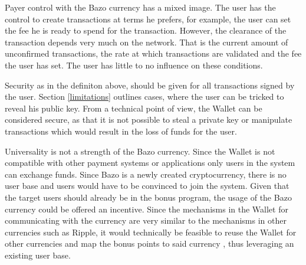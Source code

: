Payer control with the Bazo currency has a mixed image.
The user has the control to create transactions at terms he prefers, for example, the user can set the fee he is ready to spend for the transaction. However, the clearance of the transaction depends very much on the network. That is the current amount of unconfirmed transactions, the rate at which transactions are validated and the fee the user has set. The user has little to no influence on these conditions.

Security as in the definiton above, should be given for all transactions signed by the user. Section \ref{limitations} outlines cases, where the user can be tricked to reveal his public key. From a technical point of view, the Wallet can be considered secure, as that it is not possible to steal a private key or manipulate transactions which would result in the loss of funds for the user.

Universality is not a strength of the Bazo currency. Since the Wallet is not compatible with other payment systems or applications only users in the system can exchange funds. Since Bazo is a newly created cryptocurrency, there is no user base and users would have to be convinced to join the system. Given that the target users should already be in the bonus program, the usage of the Bazo currency could be offered an incentive. Since the mechanisms in the Wallet for communicating with the currency are very similar to the mechanisms in other currencies such as Ripple, it would technically be feasible to reuse the Wallet for other currencies and map the bonus points to said currency \cite{ripplelib}, thus leveraging an existing user base.

